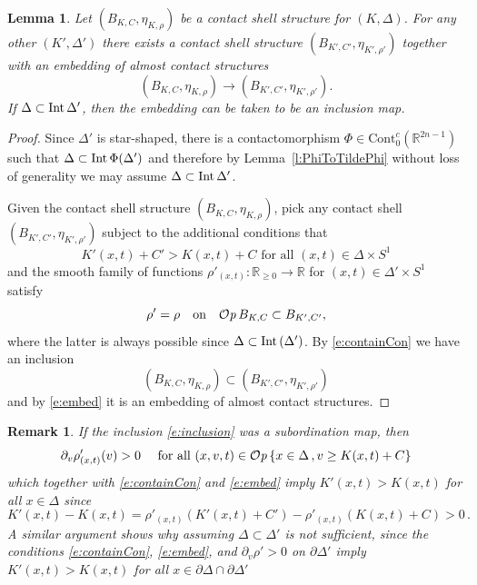 \documentclass[12pt]{paper}
\theoremstyle{plain}
\newtheorem{lemma}[theorem]{Lemma}
\newtheorem{remark}[theorem]{Remark}
\theoremstyle{definition}
\newcommand{\p}{\partial}
\newcommand{\R}{{\mathbb{R}}}
\newcommand{\Int}{{\rm Int\,}} %
\newcommand{\CCont}{\mathrm{Cont}}
\def\Op{{\mathcal O}{\it p}\,}
\numberwithin{figure}{section}
\begin{document}
\begin{lemma}\label{lem:contain}
	Let $(B_{K, C}, \eta_{K, \rho})$ be a contact shell structure for $(K, \Delta)$.  For any other
	$(K', \Delta')$ there exists a contact shell structure $(B_{K', C'}, \eta_{K', \rho'})$ together with
	an embedding of almost contact structures
	$$
		(B_{K, C}, \eta_{K, \rho}) \to (B_{K'\!, C'}, \eta_{K'\!, \rho'}).
	$$
	If $\Delta \subset \Int \Delta'$, then the embedding can be taken to be an inclusion map.
\end{lemma}
\begin{proof}
	Since $\Delta'$ is star-shaped, there is a contactomorphism $\Phi \in \CCont_0^c(\R^{2n-1})$ such that 
	$\Delta \subset \Int \Phi(\Delta')$ and therefore by Lemma~\ref{l:PhiToTildePhi} without loss of generality we may
	assume $\Delta \subset \Int \Delta'$.
	
	Given the contact shell structure $(B_{K, C}, \eta_{K, \rho})$, pick any contact shell $(B_{K'\!,C'}, \eta_{K'\!,\rho'})$
	subject to the additional conditions that
	\begin{equation}\label{e:containCon}
		K'(x,t) + C' > K(x,t) + C \mbox{ for all $(x,t) \in \Delta \times S^1$}
	\end{equation}
	and the smooth family of functions 
	$\rho'_{(x,t)} : \R_{\geq 0} \to \R$ for $(x,t) \in \Delta' \times S^1$ satisfy
	\begin{equation}\label{e:embed}
		\rho' = \rho \quad\mbox{on\quad $\Op B_{K,C} \subset B_{K',C'}$},
	\end{equation}
	where the latter is always possible since $\Delta \subset \Int(\Delta')$.
	By \eqref{e:containCon} we have an inclusion 
	\begin{equation}\label{e:inclusion}
		(B_{K,C}, \eta_{K,\rho}) \subset (B_{K'\!,C'}, \eta_{K'\!,\rho'})
	\end{equation}
	and by \eqref{e:embed} it is an embedding of almost contact structures.
\end{proof}

\begin{remark}
{\rm If the inclusion \eqref{e:inclusion} was a subordination map, then
$$
	\p_v \rho'_{(x,t)}(v) > 0 \quad\mbox{ for all $(x,v,t) \in \Op\{x \in \Delta\,, v \geq K(x,t) + C\}$}
$$
which together with \eqref{e:containCon} and \eqref{e:embed} imply $K'(x,t) > K(x,t)$ for all $x \in \Delta$ since
$$
	K'(x,t) - K(x,t) = \rho'_{(x,t)}(K'(x, t)+C') - \rho'_{(x,t)}(K(x, t)+C) > 0 \,.
$$
A similar argument shows why assuming $\Delta \subset \Delta'$ is not sufficient, since the conditions \eqref{e:containCon}, 
\eqref{e:embed}, and $\p_v\rho' > 0$ on $\p\Delta'$ imply $K'(x,t) > K(x,t)$ for all $x \in \partial \Delta \cap \p\Delta'$}
\end{remark}
\end{document}
